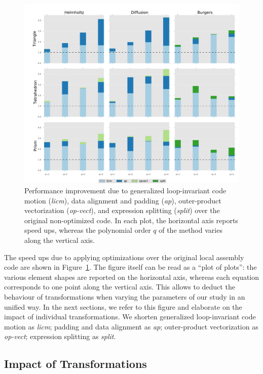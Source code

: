 \begin{figure}[t]
\centerline{\includegraphics[scale=0.45]{lowlevelopt/perf-results/individual/graph}}
\caption{Performance improvement due to generalized loop-invariant code motion (\emph{licm}), data alignment and padding (\emph{ap}), outer-product vectorization (\emph{op-vect}), and expression splitting (\emph{split}) over the original non-optimized code. In each plot, the horizontal axis reports speed ups, whereas the polynomial order $q$ of the method varies along the vertical axis.}
\label{fig:coffee-individual-res}
\end{figure}

The speed ups due to applying optimizations over the original local assembly code are shown in Figure~\ref{fig:coffee-individual-res}. The figure itself can be read as a ``plot of plots'': the various element shapes are reported on the horizontal axis, whereas each equation corresponds to one point along the vertical axis. This allows to deduct the behaviour of transformations when varying the parameters of our study in an unified way. In the next sections, we refer to this figure and elaborate on the impact of individual transformations. We shorten generalized loop-invariant code motion as \emph{licm}; padding and data alignment as \emph{ap}; outer-product vectorization as \emph{op-vect}; expression splitting as \emph{split}.

\subsection{Impact of Transformations}
